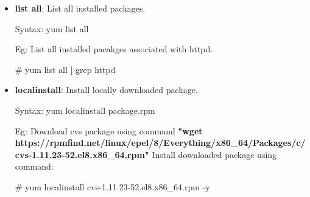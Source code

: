 \begin{flushleft}
\begin{itemize}
		\item \textbf{list all}: List all installed packages.
		\begin{tcolorbox}[breakable,notitle,boxrule=-0pt,colback=pink,colframe=pink]
			\color{black}
			\font=9pt
			Syntax: yum list all
			\font=4pt
		\end{tcolorbox}
		Eg: List all installed pacakges associated with httpd.
		\begin{tcolorbox}[breakable,notitle,boxrule=-0pt,colback=black,colframe=black]
			\color{green}
			\font=9pt
			\# yum list all | grep httpd
			\font=4pt
		\end{tcolorbox}
		\bigskip
		\bigskip					

		\item \textbf{localinstall}: Install locally downloaded package.
		\begin{tcolorbox}[breakable,notitle,boxrule=-0pt,colback=pink,colframe=pink]
			\color{black}
			\font=9pt
			Syntax: yum localinstall package.rpm
			\font=4pt
		\end{tcolorbox}
		Eg: Download cvs package using command \textbf{"wget https://rpmfind.net/linux/epel/8/Everything/x86\_64/Packages/c/cvs-1.11.23-52.el8.x86\_64.rpm"}
		\newline
		 Install downloaded package using command:
		\begin{tcolorbox}[breakable,notitle,boxrule=-0pt,colback=black,colframe=black]
			\color{green}
			\font=9pt
			\# yum localinstall cvs-1.11.23-52.el8.x86\_64.rpm -y
			\font=4pt
		\end{tcolorbox}
		\bigskip
		\bigskip					

		
	\end{itemize}
	
	
\end{flushleft}
\newpage



